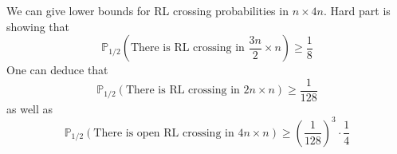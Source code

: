 \begin{remark}
    We can give lower bounds for RL crossing probabilities in \(n \times 4n\). Hard part is showing that 
    \[\mathbb{P}_{1/2}(\text{There is RL crossing in \(\frac{3n}{2}\times n\)})\geq \frac{1}{8}\]
    One can deduce that \[\mathbb{P}_{1/2 }(\text{There is RL crossing in \(2n \times n\)})\geq \frac{1}{128}\] as well as \[ \mathbb{P}_{1/2}(\text{There is open RL crossing in \(4n\times n\)}) \geq \left(\frac{1}{128}\right)^3 \cdot \frac{1}{4}\]
\end{remark}

